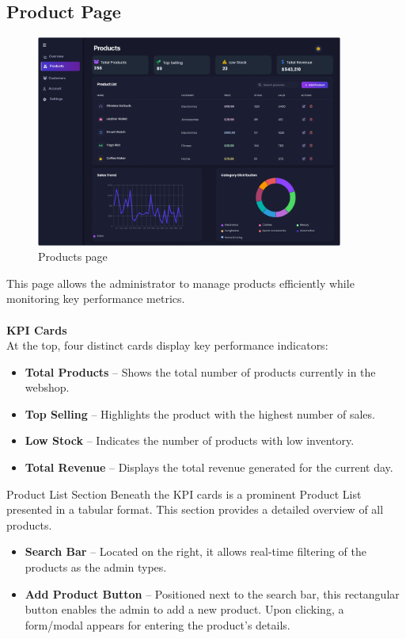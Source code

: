 \documentclass[11pt,a4paper]{article}
\begin{document}
	
	\subsection{Product Page}\label{subsec:product-page}
	\begin{figure}[h]
		\centering
		\includegraphics[width=0.9\textwidth]{pictures/admin/Products_Admin}
		\caption{Products page}\label{fig:figure2}
	\end{figure}
	This page allows the administrator to manage products efficiently while monitoring key performance metrics. \\ \\
	\textbf{KPI Cards} \\
	At the top, four distinct cards display key performance indicators:
	\begin{itemize}
		\item \textbf{Total Products} – Shows the total number of products currently in the webshop.
		\item \textbf{Top Selling} – Highlights the product with the highest number of sales.
		\item \textbf{Low Stock} – Indicates the number of products with low inventory.
		\item \textbf{Total Revenue} – Displays the total revenue generated for the current day.
	\end{itemize}
	Product List Section
	Beneath the KPI cards is a prominent Product List presented in a tabular format. This section provides a detailed overview of all products.
	\begin{itemize}
		\item \textbf{Search Bar} – Located on the right, it allows real-time filtering of the products as the admin types.
		\item \textbf{Add Product Button} – Positioned next to the search bar, this rectangular button enables the admin to add a new product. Upon clicking, a form/modal appears for entering the product’s details.
	\end{itemize}
\end{document}

